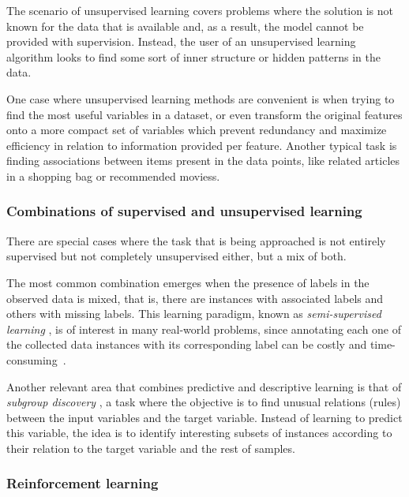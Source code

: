 The scenario of unsupervised learning  covers problems where the solution is not known for the data that is available and, as a result, the model cannot be provided with supervision. Instead, the user of an unsupervised learning algorithm looks to find some sort of inner structure or hidden patterns in the data.

One case where unsupervised learning methods are convenient is when trying to find the most useful variables in a dataset, or even transform the original features onto a more compact set of variables which prevent redundancy and maximize efficiency in relation to information provided per feature. Another typical task is finding associations between items present in the data points, like related articles in a shopping bag or recommended moviess. 

\subsubsection{Combinations of supervised and unsupervised learning}

There are special cases where the task that is being approached is not entirely supervised but not completely unsupervised either, but a mix of both.

The most common combination emerges when the presence of labels in the observed data is mixed, that is, there are instances with associated labels and others with missing labels. This learning paradigm, known as \textit{semi-supervised learning} , is of interest in many real-world problems, since annotating each one of the collected data instances with its corresponding label can be costly and time-consuming~. 

Another relevant area that combines predictive and descriptive learning is that of \textit{subgroup discovery} , a task where the objective is to find unusual relations (rules) between the input variables and the target variable. Instead of learning to predict this variable, the idea is to identify interesting subsets of instances according to their relation to the target variable and the rest of samples.

\subsubsection{Reinforcement learning}

